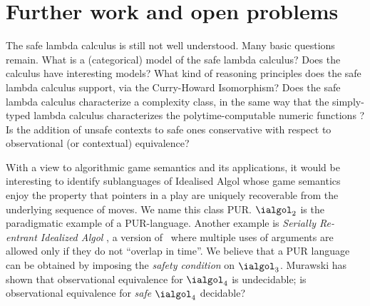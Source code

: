 
\section{Further work and open problems}

The safe lambda calculus is still not well understood. Many basic
questions remain. What is a (categorical) model of the safe lambda
calculus? Does the calculus have interesting models?  What kind of
reasoning principles does the safe lambda calculus support, via the
Curry-Howard Isomorphism? Does the safe lambda calculus characterize
a complexity class, in the same way that the simply-typed lambda
calculus characterizes the polytime-computable numeric functions
\cite{DBLP:conf/tlca/LeivantM93}?  Is the addition of unsafe
contexts to safe ones conservative with respect to observational (or
contextual) equivalence?

With a view to algorithmic game semantics and its applications, it
would be interesting to identify sublanguages of Idealised Algol
whose game semantics enjoy the property that pointers in a play are
uniquely recoverable from the underlying sequence of moves. We name
this class PUR. $\ialgol_2$ is the paradigmatic example of a
PUR-language. Another example is \emph{Serially Re-entrant Idealized
  Algol} \cite{abramsky:mchecking_ia}, a version of \ialgol\ where
multiple uses of arguments are allowed only if they do not ``overlap
in time''.  We believe that a PUR language can be obtained by
imposing the \emph{safety condition} on $\ialgol_3$. Murawski
\cite{Murawski2003} has shown that observational equivalence for
$\ialgol_4$ is undecidable; is observational equivalence for
\emph{safe} $\ialgol_4$ decidable?
